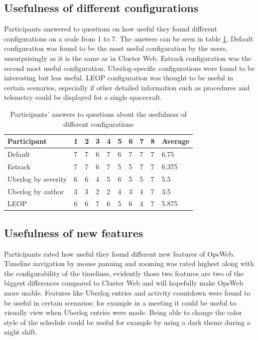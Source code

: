 \subsection{Usefulness of different configurations}
Participants answered to questions on how useful they found different configurations on a scale from 1 to 7. The answers can be seen in table \ref{config_usefulness}. Default configuration was found to be the most useful configuration by the users, unsurprisingly as it is the same as in Cluster Web. Estrack configuration was the second most useful configuration. Uberlog-specific configurations were found to be interesting but less useful. LEOP configuration was thought to be useful in certain scenarios, especially if other detailed information such as procedures and telemetry could be displayed for a single spacecraft.
\begin{table}[!ht]
\def\arraystretch{1.1}%
    \begin{center}
    \caption{Participants' answers to questions about the usefulness of different configurations}
    \label{config_usefulness}
    \begin{tabular}{| l | l | l | l | l | l | l | l | l | l | }
    \hline
    Participant & 1 & 2 & 3 & 4 & 5 & 6 & 7 & 8 & Average  \\
    \hline
    Default    & 7  & 7 & 6 & 7 & 6 & 7 & 7 & 7 & 6.75   \\
    Estrack    & 7  & 7 & 6 & 7 & 5 & 5 & 7 & 7 & 6.375   \\
    Uberlog by severity    & 6  & 6 & 4 & 5 & 6 & 5 & 5 & 7 & 5.5   \\
    Uberlog by author    & 3  & 3 & 2 & 2 & 4 & 3 & 4 & 7 & 3.5   \\
    LEOP    & 6  & 6 & 7 & 6 & 5 & 6 & 4 & 7 & 5.875   \\
    \hline
    \end{tabular}
    \end{center}
\end{table}

\subsection{Usefulness of new features}
Participants rated how useful they found different new features of OpsWeb. Timeline navigation by mouse panning and zooming was rated highest along with the configurability of the timelines, evidently those two features are two of the biggest differences compared to Cluster Web and will hopefully make OpsWeb more usable. Features like Uberlog entries and activity countdown were found to be useful in certain scenarios; for example in a meeting it could be useful to visually view when Uberlog entries were made. Being able to change the color style of the schedule could be useful for example by using a dark theme during a night shift.

